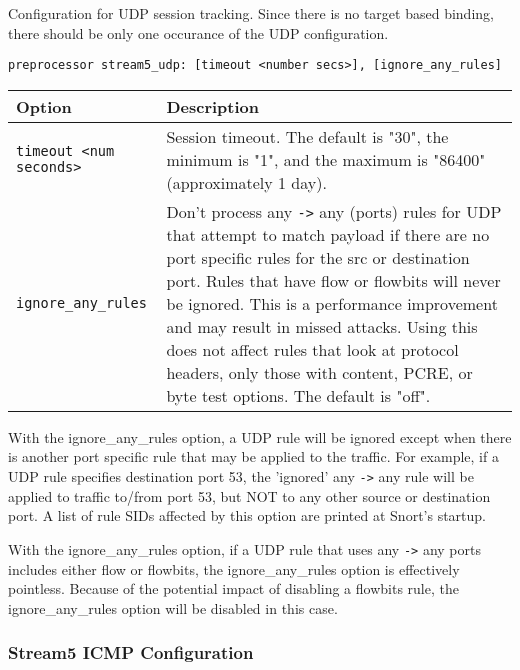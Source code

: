 \documentclass[english]{report}
\newenvironment{note}{
\samepage
    \vspace{10pt}{\textsf{
        {\hspace{7pt}\Huge{$\triangle$\hspace{-12.5pt}{\Large{$^!$}}}}\hspace{5pt}
        {\Large{NOTE}}
    }
    }
   \begin{center}
    \par\vspace{-17pt}

    \begin{lrbox}{\savepar}
    \begin{minipage}[r]{6in}
}
{
    \end{minipage}
    \end{lrbox}
    \fbox{
        \usebox{
            \savepar
	}
    }
    \par\vskip10pt
    \end{center}
}
\begin{document}
Configuration for UDP session tracking.  Since there is no target based
binding, there should be only one occurance of the UDP configuration.

\begin{verbatim}
preprocessor stream5_udp: [timeout <number secs>], [ignore_any_rules]
\end{verbatim}

\begin{tabular}{| l | p{3.5in} |}
\hline
\textbf{Option} & \textbf{Description}\\
\hline 
\hline 
\texttt{timeout <num seconds>} & Session timeout.  The default is "30", the minimum is "1", and the maximum is "86400" (approximately 1 day).\\
\hline
\texttt{ignore\_any\_rules} & Don't process any \texttt{->} any (ports) rules for UDP that attempt to match payload if there are no port specific rules for the src or destination port.  Rules that have flow or flowbits will never be ignored.  This is a performance improvement and may result in missed attacks.  Using this does not affect rules that look at protocol headers, only those with content, PCRE, or byte test options.  The default is "off".\\
\hline
\end{tabular}

\begin{note}
With the ignore\_any\_rules option, a UDP rule will be ignored except when
there is another port specific rule that may be applied to the traffic.  For
example, if a UDP rule specifies destination port 53, the 'ignored' any \texttt{->} any
rule will be applied to traffic to/from port 53, but NOT to any other
source or destination port.  A list of rule SIDs affected by this option
are printed at Snort's startup.
\end{note}

\begin{note}
With the ignore\_any\_rules option, if a UDP rule that uses any \texttt{->} any
ports includes either flow or flowbits, the ignore\_any\_rules option is
effectively pointless.  Because of the potential impact of disabling a flowbits
rule, the ignore\_any\_rules option will be disabled in this case.
\end{note}

\subsubsection{Stream5 ICMP Configuration}
\end{document}
